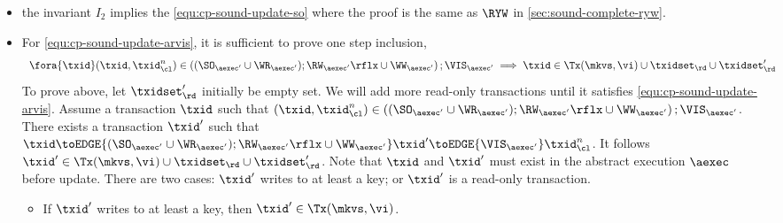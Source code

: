 \begin{itemize}
\item the invariant \( I_2 \) implies the \cref{equ:cp-sound-update-so} where the proof is the same as \( \RYW \) in \cref{sec:sound-complete-ryw}.

\item For \cref{equ:cp-sound-update-arvis}, it is sufficient to prove one step inclusion, \ie
\[
    \begin{array}{l}
    \fora{\txid} (\txid, \txid_\cl^n) \in \left( (\SO_{\aexec'} \cup \WR_{\aexec'} ) ; \RW_{\aexec'}\rflx \cup \WW_{\aexec'} \right) ; \VIS_{\aexec'} 
    \implies \txid \in \Tx(\mkvs, \vi) \cup \txidset_\rd \cup \txidset'_\rd 
\end{array}
\]
To prove above, let \( \txidset'_\rd \) initially be empty set.
We will add more read-only transactions until it satisfies \cref{equ:cp-sound-update-arvis}.
Assume a transaction \( \txid \) such that 
\( (\txid, \txid_\cl^n) \in \left( (\SO_{\aexec'} \cup \WR_{\aexec'} ) ; \RW_{\aexec'}\rflx \cup \WW_{\aexec'} \right) ; \VIS_{\aexec'}\).
There exists a transaction \( \txid' \) such that \( \txid \toEDGE{(\SO_{\aexec'} \cup \WR_{\aexec'} ) ; \RW_{\aexec'}\rflx \cup \WW_{\aexec'}} \txid' \toEDGE{\VIS_{\aexec'}}  \txid_\cl^n \).
It follows \( \txid'  \in \Tx(\mkvs, \vi) \cup \txidset_\rd \cup \txidset'_\rd  \).
Note that \( \txid \) and \( \txid' \) must exist in the abstract execution \( \aexec \) before update.
There are two cases: \( \txid' \) writes to at least a key; or \( \txid' \) is a read-only transaction.
\begin{itemize}
    \item
    If \( \txid' \) writes to at least a key, then \( \txid' \in \Tx(\mkvs, \vi)\).

\end{itemize}
\end{itemize}
